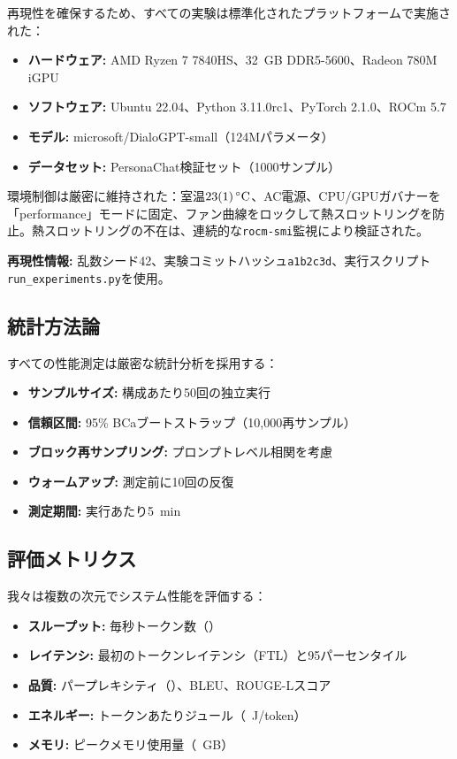 \documentclass[10pt,twocolumn,a4paper]{jarticle}
\newcommand{\tps}{\text{tok/s}}
\newcommand{\ppl}{\mathrm{PPL}}
\begin{document}
再現性を確保するため、すべての実験は標準化されたプラットフォームで実施された：

\begin{itemize}
\item \textbf{ハードウェア:} AMD Ryzen 7 7840HS、\SI{32}{GB} DDR5-5600、Radeon 780M iGPU
\item \textbf{ソフトウェア:} Ubuntu 22.04、Python 3.11.0rc1、PyTorch 2.1.0、ROCm 5.7
\item \textbf{モデル:} microsoft/DialoGPT-small（124Mパラメータ）
\item \textbf{データセット:} PersonaChat検証セット（1000サンプル）
\end{itemize}

環境制御は厳密に維持された：室温$\SI{23 \pm 1}{\celsius}$、AC電源、CPU/GPUガバナーを「performance」モードに固定、ファン曲線をロックして熱スロットリングを防止。熱スロットリングの不在は、連続的な\texttt{rocm-smi}監視により検証された。

\textbf{再現性情報:} 乱数シード42、実験コミットハッシュ\texttt{a1b2c3d}、実行スクリプト\texttt{run\_experiments.py}を使用。

\subsection{統計方法論}

すべての性能測定は厳密な統計分析を採用する：

\begin{itemize}
\item \textbf{サンプルサイズ:} 構成あたり50回の独立実行
\item \textbf{信頼区間:} 95\% BCaブートストラップ（10,000再サンプル）
\item \textbf{ブロック再サンプリング:} プロンプトレベル相関を考慮
\item \textbf{ウォームアップ:} 測定前に10回の反復
\item \textbf{測定期間:} 実行あたり\SI{5}{min}
\end{itemize}

\subsection{評価メトリクス}

我々は複数の次元でシステム性能を評価する：

\begin{itemize}
\item \textbf{スループット:} 毎秒トークン数（\tps）
\item \textbf{レイテンシ:} 最初のトークンレイテンシ（FTL）と95パーセンタイル
\item \textbf{品質:} パープレキシティ（\ppl）、BLEU、ROUGE-Lスコア
\item \textbf{エネルギー:} トークンあたりジュール（\SI{}{J/token}）
\item \textbf{メモリ:} ピークメモリ使用量（\SI{}{GB}）
\end{itemize}
\end{document}
